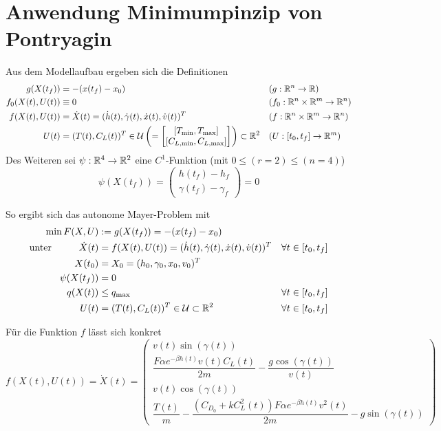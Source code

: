 \section{Anwendung Minimumpinzip von Pontryagin}
Aus dem Modellaufbau ergeben sich die Definitionen 
\begin{align*}
    g(X(t_f)) &=  -(x(t_f) - x_0) & & (g : \mathbb{R}^n \to \mathbb{R}) \\
    f_0(X(t),U(t)) &\equiv 0 & &(f_0 : \mathbb{R}^n \times \mathbb{R}^m \to \mathbb{R}^n)\\
    f(X(t),U(t)) &= \dot{X}(t) = (\dot{h}(t),\dot{\gamma}(t),\dot{x}(t),\dot{v}(t))^T & &(f : \mathbb{R}^n \times \mathbb{R}^m \to \mathbb{R}^n) \\
    U(t) &= (T(t),C_L(t))^T \in \mathcal{U} \left( = 
    \left[
        \begin{matrix}
            [T_{\min},T_{\max}] \\ 
            [C_{L, \min},C_{L, \max}]
        \end{matrix} 
    \right]\right) \subset \mathbb{R}^2 & &(U : [t_0,t_f] \to \mathbb{R}^m)
\end{align*}
Des Weiteren sei $\psi : \mathbb{R}^4 \to \mathbb{R}^2$ eine $C^1$-Funktion (mit $0 \leq (r = 2) \leq (n = 4)$) \[\psi(X(t_f)) = 
\begin{pmatrix}
    h(t_f) - h_f \\ 
    \gamma(t_f) - \gamma_f
\end{pmatrix} = 0\]

So ergibt sich das autonome Mayer-Problem mit 
\begin{equation} \label{equ:mayer_problem}
    \begin{aligned}
        \min F(X,U) &:= g(X(t_f)) =  -(x(t_f) - x_0) & & \\
        \text{unter}  \hspace{10mm} \dot{X}(t) &= f(X(t),U(t)) = (\dot{h}(t),\dot{\gamma}(t),\dot{x}(t),\dot{v}(t))^T & & \forall t \in [t_0,t_f] \\
        X(t_0) &= X_0 = (h_0,\gamma_0,x_0,v_0)^T & & \\
        \psi(X(t_f)) &= 0 & & \\
        q(X(t)) &\leq q_{\max} & & \forall t \in [t_0,t_f] \\
        U(t) &= (T(t),C_L(t))^T \in \mathcal{U} \subset \R^2  & & \forall t \in [t_0,t_f] 
    \end{aligned}
\end{equation}

Für die Funktion $f$ lässt sich konkret
\begin{equation} \label{equ:state_space}
    f(X(t),U(t)) = \dot{X}(t) = \begin{pmatrix}
        v(t) \sin(\gamma(t)) \\ 
        \dfrac{F \alpha e^{-\beta h(t)} v(t) C_L(t)}{2m} - \dfrac{g \cos(\gamma(t))}{v(t)} \\ 
        v(t) \cos(\gamma(t)) \\ 
        \dfrac{T(t)}{m} - \dfrac{(C_{D_0} + k C_L^2(t)) F \alpha e^{-\beta h(t)} v^2(t)}{2m} - g \sin(\gamma(t))
    \end{pmatrix}
\end{equation}

